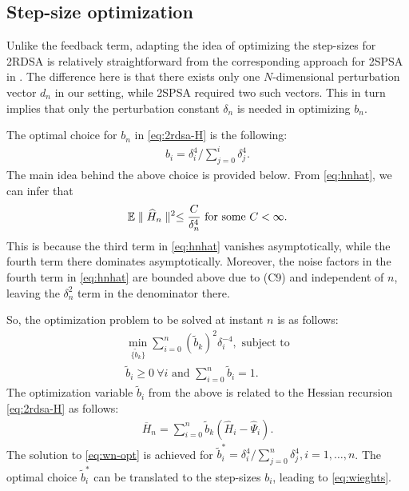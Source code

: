 \documentclass[letterpaper, 10 pt, conference]{ieeeconf}  %
\begin{document}
\subsection{Step-size optimization}
Unlike the feedback term, adapting the idea of optimizing the step-sizes for 2RDSA is relatively straightforward from the corresponding approach for 2SPSA in \cite{spall-jacobian}. The difference here is that there exists only one $N$-dimensional perturbation vector $d_n$ in our setting, while 2SPSA required two such vectors. This in turn implies that only the perturbation constant $\delta_n$ is needed in optimizing $b_n$.

The optimal choice for $b_n$ in \eqref{eq:2rdsa-H} is the following:
\begin{align}
\label{eq:wieghts}
b_i  = \delta_i^{4}/\sum\limits_{j=0}^{i} \delta_j^{4}.
\end{align}
The main idea behind the above choice is provided below.
From \eqref{eq:hnhat}, we can infer that
\begin{align*}
\mathbb{E} \parallel \widehat H_n \parallel^2 \le \dfrac{C}{\delta_n^4} \text{ for some } C<\infty. 
\end{align*} 
This is because the third term in \eqref{eq:hnhat} vanishes asymptotically, while the fourth term there dominates asymptotically. Moreover, the noise factors in the fourth term in \eqref{eq:hnhat} are bounded above due to (C9) and independent of $n$, leaving the $\delta_n^2$ term in the denominator there. 

So, the optimization problem to be solved at instant $n$ is as follows:
\begin{align}
\min_{ \{\tilde b_k\} } \sum \limits_{i=0}^{n} (\tilde b_k)^2 \delta_i^{-4}, \text{ subject to} \label{eq:wn-opt}\\
\tilde b_i \geq 0 ~\forall i \text{ and }\sum \limits_{i=0}^{n} \tilde b_i = 1.
\end{align}
The optimization variable $\tilde b_i$ from the above is related to the Hessian recursion \eqref{eq:2rdsa-H} as follows:
\begin{align}
\label{eq:hess}
\overline H_n = \sum\limits_{i=0}^{n} \tilde b_k(\widehat H_i -\widehat \Psi_i).
\end{align}
The solution to \eqref{eq:wn-opt} is achieved for $\tilde b_i^* = \delta_i^{4}/\sum \limits_{j=0}^{n} \delta_j^{4}, i=1,\ldots,n$. The optimal choice $\tilde b_i^*$ can be translated to the step-sizes $b_i$, leading to \eqref{eq:wieghts}.
\end{document}
